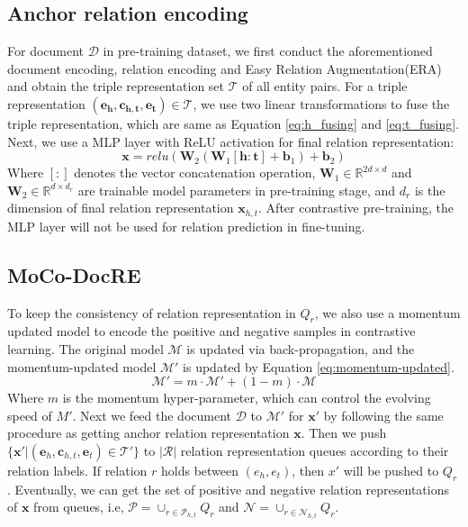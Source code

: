 \documentclass[11pt]{article}
\begin{document}
\subsection{Anchor relation encoding}
    For document $\mathcal{D}$ in pre-training dataset, we first conduct the aforementioned document encoding, relation encoding and Easy Relation Augmentation(ERA) and obtain the triple representation set $\mathcal{T}$ of all entity pairs. For a triple representation $\mathbf{(e_h,c_{h,t},e_t)} \in \mathcal{T}$, we use two linear transformations to fuse the triple representation, which are same as Equation \ref{eq:h_fusing} and \ref{eq:t_fusing}. Next, we use a MLP layer with ReLU activation for final relation representation:
    \begin{equation}
        \mathbf{x} = relu(\mathbf{W}_2(\mathbf{W}_1 [\mathbf{h:t}] + \mathbf{b}_1) + \mathbf{b}_2)
    \end{equation}
    Where $[:]$ denotes the vector concatenation operation, $\mathbf{W}_1 \in \mathbb{R}^{2d\times d}$ and $\mathbf{W}_2 \in \mathbb{R}^{d\times d_r}$ are trainable model parameters in pre-training stage, and $d_r$ is the dimension of final relation representation $\mathbf{x}_{h,t}$. After contrastive pre-training, the MLP layer will not be used for relation prediction in fine-tuning.
\subsection{MoCo-DocRE}
    To keep the consistency of relation representation in $Q_r$, we also use a momentum updated model to encode the positive and negative samples in contrastive learning\citep{he_momentum_2020}. The original model $\mathcal{M}$ is updated via back-propagation, and the momentum-updated model $\mathcal{M}'$ is updated by Equation \ref{eq:momentum-updated}. 
    \begin{equation}
        \label{eq:momentum-updated}
        \mathcal{M}' = m \cdot \mathcal{M}' + (1-m) \cdot \mathcal{M}
    \end{equation}
    Where $m$ is the momentum hyper-parameter, which can control the evolving speed of $M'$. Next we feed the document $\mathcal{D}$ to $\mathcal{M}'$ for $\mathbf{x}'$ by following the same procedure as getting anchor relation representation $\mathbf{x}$. Then we push $\{\mathbf{x'} | (\mathbf{e}_h,\mathbf{c}_{h,t},\mathbf{e}_t) \in \mathcal{T}'\}$ to $|\mathcal{R}|$ relation representation queues according to their relation labels. If relation $r$ holds between $(e_h,e_t)$, then $x'$ will be pushed to $Q_r$. Eventually, we can get the set of positive and negative relation representations of $\mathbf{x}$ from queues, i.e, $\mathcal{P} = \cup _{r \in \mathcal{P}_{h,t}} Q_r$ and $\mathcal{N}=\cup _{r \in \mathcal{N}_{h,t}} Q_r$.
    
\end{document}

